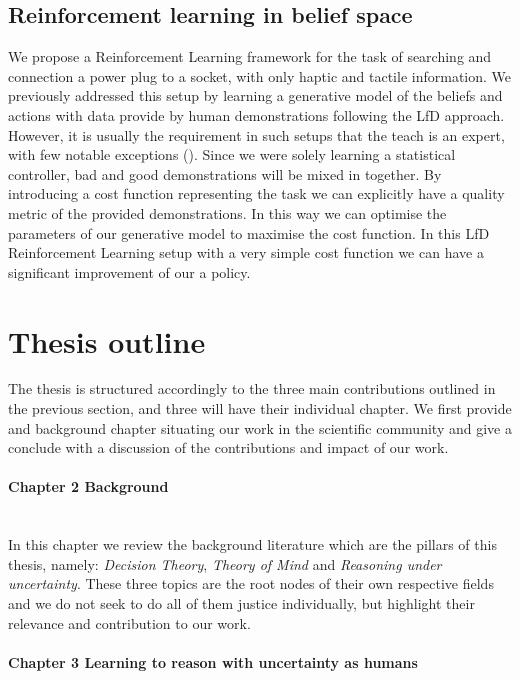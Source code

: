 \subsection{Reinforcement learning in belief space}

We propose a Reinforcement Learning framework for the task of searching and connection a power plug to a socket, with only haptic 
and tactile information. We previously addressed this setup by learning a generative model of the beliefs and actions with data 
provide by human demonstrations following the LfD approach. However, it is usually the requirement in such setups that 
the teach is an expert, with few notable exceptions (\cite{rai2013learning}). Since we were solely learning a 
statistical controller, bad and good demonstrations will be mixed in together. By introducing a cost function 
representing the task we can explicitly have a quality metric of the provided demonstrations. In this way 
we can optimise the parameters of our generative model to maximise the cost function. In this LfD Reinforcement 
Learning setup with a very simple cost function we can have a significant improvement of our a policy.

\section{Thesis outline}

The thesis is structured accordingly to the three main contributions outlined in the previous section, 
and three will have their individual chapter. We first provide and background chapter situating our work 
in the scientific community and give a conclude with a discussion of the contributions and impact of 
our work.

\begin{minipage}[c]{0.9\textwidth}
\paragraph{Chapter 2 Background}\\
In this chapter we review the background literature which are the pillars of this 
thesis, namely: \textit{Decision Theory}, \textit{Theory of Mind} and \textit{Reasoning under uncertainty}. 
These three topics are the root nodes of their own respective fields and we do not seek to do all of them justice 
individually, but highlight their relevance and contribution to our work.
\end{minipage}

\begin{minipage}[c]{0.9\textwidth}
\paragraph{Chapter 3 Learning to reason with uncertainty as humans}\\
\end{minipage}


